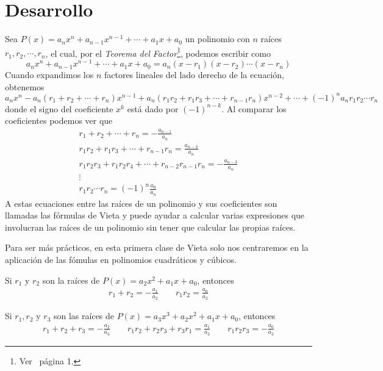 \section{Desarrollo}
{
    \begin{section-definition}
        Sea $P(x) = a_n x^n + a_{n - 1} x^{n - 1} + \cdots  + a_1 x + a_0$ un polinomio con $n$ raíces $r_1, r_2, \cdots, r_n$,
        el cual, por el \textit{Teorema del Factor}\footnote{Ver~\cite{TD23-clase2} página 1.}, podemos escribir como
        \[a_n x^n + a_{n - 1} x^{n - 1} + \cdots  + a_1 x + a_0 = a_n (x - r_1)(x - r_2) \cdots (x - r_n)\]
        Cuando expandimos los $n$ factores lineales del lado derecho de la ecuación, obtenemos
        \[a_n x^n - a_n(r_1 + r_2 + \cdots + r_n)x^{n - 1} + a_n(r_1 r_2 + r_1 r_3 + \cdots + r_{n - 1} r_n)x^{n - 2} + \cdots + (-1)^n a_n r_1 r_2 \cdots r_n\]
        donde el signo del coeficiente $x^k$ está dado por $(-1)^{n - k}$. Al comparar los coeficientes podemos ver que
        \begin{gather*}
            r_1 + r_2 + \cdots + r_n = - \frac{a_{n - 1}}{a_n}\\
            r_1 r_2 + r_1 r_3 + \cdots + r_{n - 1} r_n = \frac{a_{n - 2}}{a_n}\\
            r_1 r_2 r_3 + r_1 r_2 r_4 + \cdots + r_{n - 2} r_{n - 1} r_n = -\frac{a_{n - 3}}{a_n}\\
            \vdots\\
            r_1 r_2 \cdots r_n = (-1)^n \frac{a_0}{a_n}
        \end{gather*}
        A estas ecuaciones entre las raíces de un polinomio y sus coeficientes son llamadas las fórmulas de Vieta y puede
        ayudar a calcular varias expresiones que involucran las raíces de un polinomio sin tener que calcular las propias raíces.
    \end{section-definition}

    Para ser más prácticos, en esta primera clase de Vieta solo nos centraremos en la aplicación de las fómulas en polinomios cuadráticos y cúbicos.

    \begin{debox}
        Si $r_1$ y $r_2$ son la raíces de $P(x) = a_2 x^2 + a_1 x + a_0$, entonces
        \begin{gather*}
            r_1 + r_2 = - \frac{a_1}{a_2} \qquad r_1 r_2 = \frac{a_0}{a_2}
        \end{gather*}

        Si $r_1, r_2$ y $r_3$ son las raíces de $P(x) = a_3 x^3 + a_2 x^2 + a_1 x + a_0$, entonces
        \begin{gather*}
            r_1 + r_2 + r_3 = - \frac{a_2}{a_3}\qquad
            r_1 r_2 + r_2 r_3 + r_3 r_1 = \frac{a_1}{a_3}\qquad
            r_1 r_2 r_3 = - \frac{a_0}{a_3}
        \end{gather*}
    \end{debox}

}
